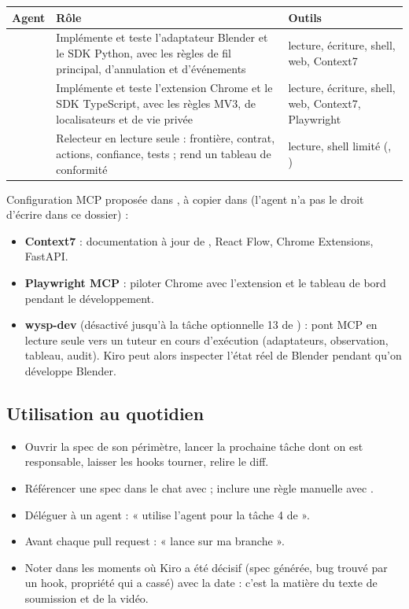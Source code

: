 {\small\setlength{\tabcolsep}{4pt}
\begin{xltabular}{\textwidth}{@{}L{3.4cm}Y L{3.6cm}@{}}
\toprule
\textbf{Agent} & \textbf{Rôle} & \textbf{Outils} \\
\midrule
{} & Implémente et teste l'adaptateur Blender et le SDK Python, avec les règles de fil principal, d'annulation et d'événements & lecture, écriture, shell, web, Context7 \\
 & Implémente et teste l'extension Chrome et le SDK TypeScript, avec les règles MV3, de localisateurs et de vie privée & lecture, écriture, shell, web, Context7, Playwright \\
 & Relecteur en lecture seule : frontière, contrat, actions, confiance, tests ; rend un tableau de conformité & lecture, shell limité (, ) \\
\bottomrule
\end{xltabular}}

Configuration MCP proposée dans , à copier dans  (l'agent n'a pas le droit d'écrire dans ce dossier) :
\begin{itemize}[leftmargin=1.2em]
  \item \textbf{Context7} : documentation à jour de , React Flow, Chrome Extensions, FastAPI.
  \item \textbf{Playwright MCP} : piloter Chrome avec l'extension et le tableau de bord pendant le développement.
  \item \textbf{wysp-dev} (désactivé jusqu'à la tâche optionnelle 13 de ) : pont MCP en lecture seule vers un tuteur en cours d'exécution (adaptateurs, observation, tableau, audit). Kiro peut alors inspecter l'état réel de Blender pendant qu'on développe Blender.
\end{itemize}

\subsection{Utilisation au quotidien}

\begin{itemize}[leftmargin=1.2em]
  \item Ouvrir la spec de son périmètre, lancer la prochaine tâche dont on est responsable, laisser les hooks tourner, relire le diff.
  \item Référencer une spec dans le chat avec  ; inclure une règle manuelle avec .
  \item Déléguer à un agent : « utilise l'agent  pour la tâche 4 de  ».
  \item Avant chaque pull request : « lance  sur ma branche ».
  \item Noter dans  les moments où Kiro a été décisif (spec générée, bug trouvé par un hook, propriété qui a cassé) avec la date : c'est la matière du texte de soumission et de la vidéo.
\end{itemize}
